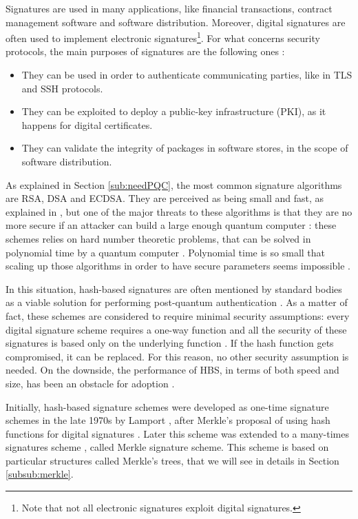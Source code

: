 \documentclass[a4paper,12pt]{article}
\begin{document}
Signatures are used in many applications, like financial transactions, contract management software and software distribution. Moreover, digital signatures are often used to implement electronic signatures\footnote{Note that not all electronic signatures exploit digital signatures.}. For what concerns security protocols, the main purposes of signatures are the following ones \cite{7_hashbased}:
\begin{itemize}
	\item They can be used in order to authenticate communicating parties, like in TLS and SSH protocols.
	\item They can be exploited to deploy a public-key infrastructure (PKI), as it happens for digital certificates.
	\item They can validate the integrity of packages in software stores, in the scope of software distribution.
\end{itemize}

As explained in Section \ref{sub:needPQC}, the most common signature algorithms are RSA, DSA and ECDSA.
They are perceived as being small and fast, as explained in \cite{1_sphincspaper}, but one of the major threats to these algorithms is that they are no more secure if an attacker can build a large enough quantum computer \cite{4_wings}: these schemes relies on hard number theoretic problems, that can be solved in polynomial time by a quantum computer \cite{15_ShorPolynomial}. Polynomial time is so small that scaling up those algorithms in order to have secure parameters seems impossible \cite{1_sphincspaper}.

In this situation, hash-based signatures are often mentioned by standard bodies as a viable solution for performing post-quantum authentication \cite{9_postquantum_auth_openssl}.
As a matter of fact, these schemes are considered to require minimal security assumptions: every digital signature scheme requires a one-way function and all the security of these signatures is based only on the underlying function \cite{4_wings}. If the hash function gets compromised, it can be replaced. For this reason, no other security assumption is needed.
On the downside, the performance of HBS, in terms of both speed and size, has been an obstacle for adoption \cite{3_SPHINCS_secondpaper}.

Initially, hash-based signature schemes were developed as one-time signature schemes in the late 1970s by Lamport \cite{31_Lamport}, after Merkle's proposal of using hash functions for digital signatures \cite{30_Merkle}. Later this scheme was extended to a many-times signatures scheme \cite{2_SPHINCS+_round2}, called Merkle signature scheme. This scheme is based on particular structures called Merkle's trees, that we will see in details in Section \ref{subsub:merkle}.
\end{document}

